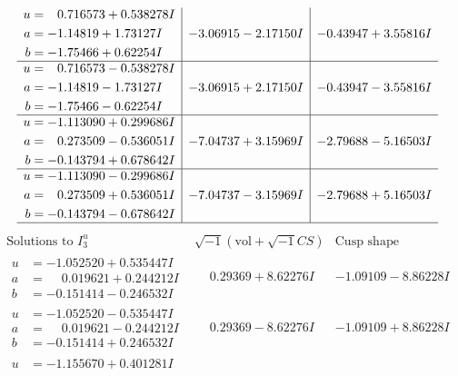 \documentclass[1p]{elsarticle_modified}
\theoremstyle{definition}
\newcommand{\I}{\sqrt{-1}}
\begin{document}
$$\begin{array}{c|c|c}
\begin{aligned}
u &= \phantom{-}0.716573 + 0.538278 I \\
a &= -1.14819 + 1.73127 I \\
b &= -1.75466 + 0.62254 I\end{aligned}
 & -3.06915 - 2.17150 I & -0.43947 + 3.55816 I \\ \hline\begin{aligned}
u &= \phantom{-}0.716573 - 0.538278 I \\
a &= -1.14819 - 1.73127 I \\
b &= -1.75466 - 0.62254 I\end{aligned}
 & -3.06915 + 2.17150 I & -0.43947 - 3.55816 I \\ \hline\begin{aligned}
u &= -1.113090 + 0.299686 I \\
a &= \phantom{-}0.273509 - 0.536051 I \\
b &= -0.143794 + 0.678642 I\end{aligned}
 & -7.04737 + 3.15969 I & -2.79688 - 5.16503 I \\ \hline\begin{aligned}
u &= -1.113090 - 0.299686 I \\
a &= \phantom{-}0.273509 + 0.536051 I \\
b &= -0.143794 - 0.678642 I\end{aligned}
 & -7.04737 - 3.15969 I & -2.79688 + 5.16503 I\\
 \hline 
 \end{array}$$\newpage$$\begin{array}{c|c|c}  
\text{Solutions to }I^u_{3}& \I (\text{vol} + \sqrt{-1}CS) & \text{Cusp shape}\\
 \hline 
\begin{aligned}
u &= -1.052520 + 0.535447 I \\
a &= \phantom{-}0.019621 + 0.244212 I \\
b &= -0.151414 - 0.246532 I\end{aligned}
 & \phantom{-}0.29369 + 8.62276 I & -1.09109 - 8.86228 I \\ \hline\begin{aligned}
u &= -1.052520 - 0.535447 I \\
a &= \phantom{-}0.019621 - 0.244212 I \\
b &= -0.151414 + 0.246532 I\end{aligned}
 & \phantom{-}0.29369 - 8.62276 I & -1.09109 + 8.86228 I \\ \hline\begin{aligned}
u &= -1.155670 + 0.401281 I \\

\end{aligned}
\end{array}$$
\end{document}
